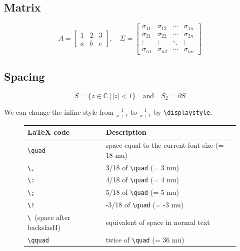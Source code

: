 \documentclass[a4paper]{article}
\begin{document}
\subsection{Matrix}

\begin{equation}
A = \begin{bmatrix}
1 & 2 & 3\\
a & b & c
\end{bmatrix},\quad
\Sigma = \begin{bmatrix}
   \sigma_{11} & \sigma_{12} & \cdots & \sigma_{1n} \\
	 \sigma_{21} & \sigma_{22} & \cdots & \sigma_{2n} \\
   \vdots & \vdots & \ddots & \vdots \\
	 \sigma_{n1} & \sigma_{n2} & \cdots & \sigma_{nn}
\end{bmatrix}
\end{equation}

\subsection{Spacing}

\begin{equation}
S = \{ z \in \mathbb{C}\, |\, |z| < 1 \} \quad \textrm{and} \quad S_2=\partial{S}
\end{equation}

We can change the inline style from $\frac{1}{x+1}$ to $\displaystyle \frac{1}{x+1}$ by \verb|\displaystyle|.

\begin{figure}[H]
\centering
\begin{tabular}{l|l}
\hline
\LaTeX{} code &	Description \\
\hline
\verb|\quad| &	space equal to the current font size (= 18 mu) \\
\verb|\,| & 3/18 of \verb|\quad| (= 3 mu) \\
\verb|\:| & 4/18 of \verb|\quad| (= 4 mu) \\
\verb|\;| & 5/18 of \verb|\quad| (= 5 mu) \\
\verb|\!| & -3/18 of \verb|\quad| (= -3 mu) \\
\verb|\ |(space after backslasH) & equivalent of space in normal text \\
\verb|\qquad| & twice of \verb|\quad| (= 36 mu) \\
\hline
\end{tabular}
\end{figure}
\end{document}
